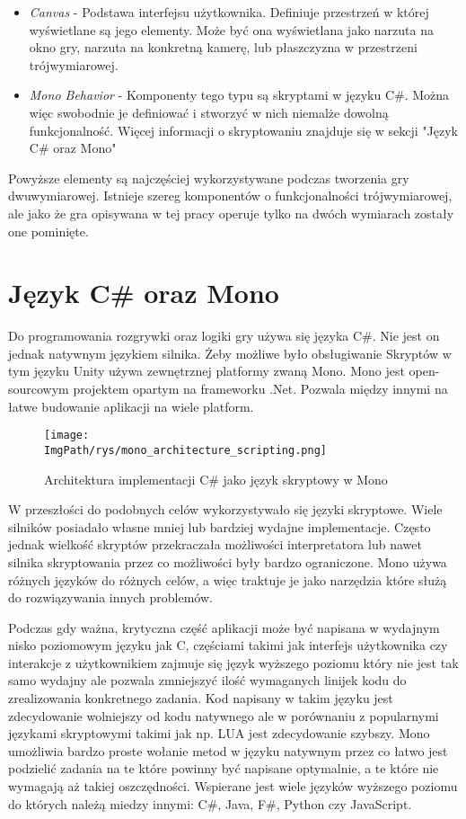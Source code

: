 \documentclass[a4paper,12pt,twoside,openany]{report}
\newcommand{\ImgPath}{.}
\begin{document}
\begin{itemize}
    \item \textit{Canvas} - Podstawa interfejsu użytkownika. Definiuje przestrzeń w której wyświetlane są jego elementy. Może być ona wyświetlana jako narzuta na okno gry, narzuta na konkretną kamerę, lub płaszczyzna w przestrzeni trójwymiarowej.
    \item \textit{Mono Behavior} - Komponenty tego typu są skryptami w języku C\#. Można więc swobodnie je definiować i stworzyć w nich niemalże dowolną funkcjonalność. Więcej informacji o skryptowaniu znajduje się w sekcji "Język C\# oraz Mono"
\end{itemize}
Powyższe elementy są najczęściej wykorzystywane podczas tworzenia gry dwuwymiarowej. Istnieje szereg komponentów o funkcjonalności trójwymiarowej, ale jako że gra opisywana w tej pracy operuje tylko na dwóch wymiarach zostały one pominięte.

\section{Język C\# oraz Mono}

Do programowania rozgrywki oraz logiki gry używa się języka C\#. Nie jest on jednak natywnym językiem silnika. Żeby możliwe było obsługiwanie Skryptów w tym języku Unity używa zewnętrznej platformy zwaną Mono. Mono jest open-sourcowym projektem opartym na frameworku .Net\cite{about_mono}. Pozwala między innymi na łatwe budowanie aplikacji na wiele platform.

\begin{figure}[!htbp]
	\begin{center}
\centering
\texttt{[image: \\ImgPath/rys/mono\_architecture\_scripting.png]}
\end{center}
	\caption{Architektura implementacji C\# jako język skryptowy w Mono}
	\label{mono_architecture_scripting}
\end{figure}

W przeszłości do podobnych celów wykorzystywało się języki skryptowe. Wiele silników posiadało własne mniej lub bardziej wydajne implementacje. Często jednak wielkość skryptów przekraczała możliwości interpretatora lub nawet silnika skryptowania przez co możliwości były bardzo ograniczone. Mono używa różnych języków do różnych celów, a więc traktuje je jako narzędzia które służą do rozwiązywania innych problemów.

Podczas gdy ważna, krytyczna część aplikacji może być napisana w wydajnym nisko poziomowym języku jak C, częściami takimi jak interfejs użytkownika czy interakcje z użytkownikiem zajmuje się język wyższego poziomu który nie jest tak samo wydajny ale pozwala zmniejszyć ilość wymaganych linijek kodu do zrealizowania konkretnego zadania. Kod napisany w takim języku jest zdecydowanie wolniejszy od kodu natywnego ale w porównaniu z popularnymi językami skryptowymi takimi jak np. LUA jest zdecydowanie szybszy. Mono umożliwia bardzo proste wołanie metod w języku natywnym przez co łatwo jest podzielić zadania na te które powinny być napisane optymalnie, a te które nie wymagają aż takiej oszczędności. Wspierane jest wiele języków wyższego poziomu do których należą miedzy innymi: C\#, Java, F\#, Python czy JavaScript.
\end{document}
